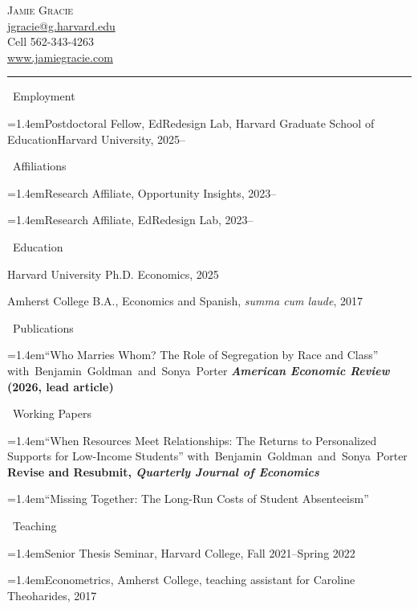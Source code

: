 \documentclass[11pt]{article}
\newcommand{\entryindent}{1.4em}  %
\newcommand{\cvsection}[1]{%
  \par\addvspace{12pt}%
  {\Large\textcolor{cvred}{\textemdash}\ #1}\par
  \nobreak\vspace{4pt}\nobreak}
\newcommand{\hang}{\hangindent=\entryindent\hangafter=1\relax}
\newcommand{\entrygap}{\par\addvspace{6pt}}
\newcommand{\sub}{\hspace*{\entryindent}}
\newcommand{\coauth}[1]{\mbox{#1}}
\begin{document}
{\fontsize{20}{24}\selectfont\scshape\color{cvred} Jamie Gracie}\\[4pt]
{\color{cvred}\small
  \href{mailto:jgracie@g.harvard.edu}{jgracie@g.harvard.edu}\\
  Cell 562-343-4263\\
  \href{https://www.jamiegracie.com}{www.jamiegracie.com}}\\[6pt]
\rule{\textwidth}{0.4pt}

\raggedright   %

\cvsection{Employment}
\hang Postdoctoral Fellow, EdRedesign Lab,
\ifed Harvard Graduate School of Education\else Harvard University\fi, 2025--\par

\cvsection{Affiliations}
\hang Research Affiliate, Opportunity Insights, 2023--\par
\hang Research Affiliate, EdRedesign Lab, 2023--\par

\cvsection{Education}
Harvard University\newline
\sub Ph.D. Economics, 2025\entrygap
Amherst College\newline
\sub B.A., Economics and Spanish, \emph{summa cum laude}, 2017\par

\cvsection{Publications}
\hang ``Who Marries Whom? The Role of Segregation by Race and Class''
\coauth{with Benjamin Goldman and Sonya Porter}\newline
\textbf{\emph{American Economic Review} (2026, lead article)}\par

\cvsection{Working Papers}
\hang ``When Resources Meet Relationships: The Returns to Personalized Supports for
Low-Income Students'' \coauth{with Benjamin Goldman and Sonya Porter}\newline
\textbf{Revise and Resubmit, \emph{Quarterly Journal of Economics}}\entrygap
\hang ``Missing Together: The Long-Run Costs of Student Absenteeism''\par

\cvsection{Teaching}
\hang Senior Thesis Seminar, Harvard College, Fall 2021--Spring 2022\par
\hang Econometrics, Amherst College, teaching assistant for Caroline Theoharides, 2017\par
\end{document}
